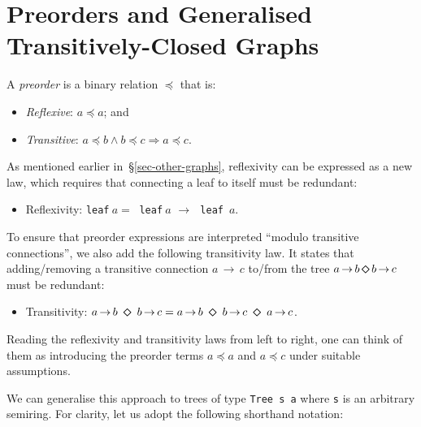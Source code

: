 \documentclass[crc,english]{programming}
\newcommand{\hcode}[1]{{\color{darkblue} \lstinline[keywordstyle={}]|#1|}} %
\newcommand{\dia}{\,\text{\raisebox{-0.3mm}{\Large $\diamond$}}\,}
\newcommand{\arr}{\,\text{$\rightarrow$}\,}
\begin{document}
\section{Preorders and Generalised Transitively-Closed Graphs}\label{sec-preorder}

A \emph{preorder} is a binary relation $\preceq$ that is:

\begin{itemize}
    \item \emph{Reflexive}: $a \preceq a$; and
    \item \emph{Transitive}: $a \preceq b \wedge b \preceq c \Rightarrow a \preceq c$.
\end{itemize}

\noindent
As mentioned earlier in~\S\ref{sec-other-graphs}, reflexivity can be expressed
as a new law, which requires that connecting a leaf to itself must be redundant:

\begin{itemize}
    \item Reflexivity:
    \hcode{leaf}$~a =~$\hcode{leaf}$~a\,\arr\,$\hcode{leaf}~$a$.
\end{itemize}

\noindent
To ensure that preorder expressions are interpreted
``modulo transitive connections'', we also add the following transitivity law.
It states that adding/removing a transitive connection $a \arr c$ to/from the
tree $a \arr b \dia b \arr c$ must be redundant:

\begin{itemize}
    \item Transitivity: $a \arr b\ \dia\ b \arr c = a \arr b\ \dia\ b \arr c\ \dia\ a \arr c$.
\end{itemize}

\noindent
Reading the reflexivity and transitivity laws from left to right, one can think
of them as introducing the preorder terms $a \preceq a$ and $a \preceq c$ under
suitable assumptions.

We can generalise this approach to trees of type \hcode{Tree s a} where
\hcode{s} is an arbitrary semiring. For clarity, let us adopt the following
shorthand notation:
\end{document}
